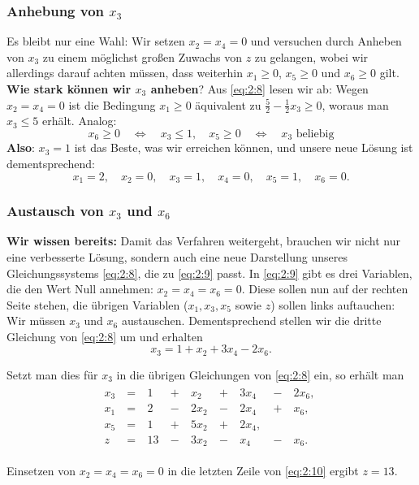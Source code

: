 \documentclass[smaller]{beamer}
\begin{document}
\begin{frame}
 \frametitle{Anhebung von $x_3$}
 \alert{Es bleibt nur eine Wahl:} Wir setzen $x_2=x_4=0$ und versuchen durch Anheben von $x_3$ zu einem möglichst großen Zuwachs von $z$ zu gelangen, wobei wir allerdings darauf achten müssen, dass weiterhin $x_1 \geq 0$, $x_5 \geq 0$ und $x_6 \geq 0$ gilt. \\ \vspace*{0.2cm}
 \textbf{Wie stark können wir $x_3$ anheben}? Aus \eqref{eq:2:8} lesen wir ab: Wegen $x_2=x_4=0$ ist die Bedingung $x_1 \geq 0$ äquivalent zu $\frac{5}{2} - \frac{1}{2}x_3 \geq 0$, woraus man $x_3 \leq 5$ erhält. Analog: 
 \begin{equation*}
  x_6 \geq 0 \quad \Leftrightarrow \quad x_3 \leq 1, \quad x_5 \geq 0 \quad \Leftrightarrow \quad x_3 \text{ beliebig}
 \end{equation*}
 \textbf{Also}: $x_3=1$ ist das Beste, was wir erreichen können, und unsere neue Lösung ist dementsprechend:
\begin{equation}
\label{eq:2:9}
x_1=2, \quad x_2=0, \quad x_3=1, \quad x_4=0, \quad x_5=1, \quad x_6=0.
\end{equation}
\end{frame}

\begin{frame}
 \frametitle{Austausch von $x_3$ und $x_6$}
 \textbf{Wir wissen bereits:} Damit das Verfahren weitergeht, brauchen wir nicht nur eine verbesserte Lösung, sondern auch eine neue Darstellung unseres Gleichungssystems \eqref{eq:2:8}, die zu \eqref{eq:2:9} passt. In \eqref{eq:2:9} gibt es drei Variablen, die den Wert Null annehmen: $x_2=x_4=x_6=0$. Diese sollen nun auf der rechten Seite stehen, die übrigen Variablen ($x_1,x_3,x_5$ sowie $z$) sollen links auftauchen: Wir müssen $x_3$ und $x_6$ austauschen. Dementsprechend stellen wir die dritte Gleichung von \eqref{eq:2:8} um und erhalten
\[
x_3 = 1 + x_2 + 3x_4 - 2x_6.
\]

Setzt man dies für $x_3$ in die übrigen Gleichungen von \eqref{eq:2:8} ein, so erhält man
\begin{align}
\begin{alignedat}{5}
\label{eq:2:10}
x_3 &\ = &\  1 &\ + &\  x_2 &\ + &\ 3x_4 &\ - &\ 2x_6,\ \\
x_1 &\ = &\  2 &\ - &\ 2x_2 &\ - &\ 2x_4 &\ + &\  x_6,\ \\
x_5 &\ = &\  1 &\ + &\ 5x_2 &\ + &\ 2x_4, &    &        \\
z   &\ = &\ 13 &\ - &\ 3x_2 &\ - &\  x_4 &\ - &\  x_6.\
\end{alignedat}
\end{align}

Einsetzen von $x_2=x_4=x_6=0$ in die letzten Zeile von \eqref{eq:2:10} ergibt $z=13$.
\end{frame}
\end{document}
